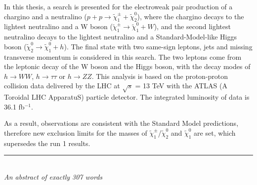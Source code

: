 In this thesis, a search is presented for the electroweak pair production of a chargino and a neutralino ($p + p \rightarrow \tilde{\chi}_1^\pm + \tilde{\chi}_2^0$),
where the chargino decays to the lightest neutralino and a W boson ($\tilde{\chi}_1^\pm \rightarrow \tilde{\chi}_1^0 + W$),
and the second lightest neutralino decays to the lightest neutralino and a Standard-Model-like Higgs boson ($\tilde{\chi}_2^0 \rightarrow \tilde{\chi}_1^0 + h$).
The final state with two same-sign leptons, jets and missing transverse momentum is considered in this search.
The two leptons come from the leptonic decay of the W boson and the Higgs boson, with the decay modes of  $h \rightarrow WW$, $h \rightarrow \tau \tau$ or $h \rightarrow ZZ$.
This analysis is based on the proton-proton collision data delivered by the LHC at $\sqrt{s}$ = 13 TeV with the ATLAS (A Toroidal LHC ApparatuS) particle detector.
The integrated luminosity of data is 36.1 fb$^{-1}$.

As a result, observations are consistent with the Standard Model predictions, therefore new exclusion limits for the masses of $\tilde{\chi}_1^\pm$/$\tilde{\chi}_2^0$ and $\tilde{\chi}_1^0$ are set, which supersedes the run 1 results.

\bigskip

\begin{center}

\rule{6cm}{0.025cm}\\
{\slshape An abstract of exactly 307 words}

\end{center}
